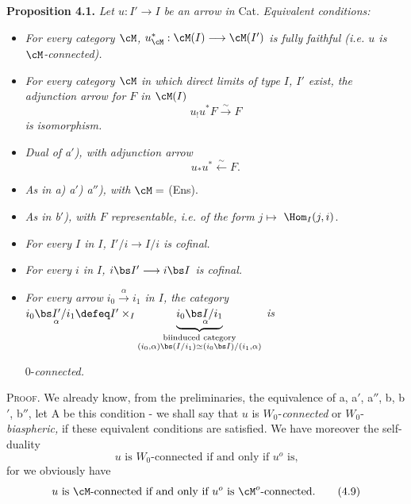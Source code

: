 \noindent\textbf{Proposition 4.1.} \textit{Let $u : I' \longrightarrow I$ be an arrow in} Cat. \textit{Equivalent conditions:}
\begin{itemize}[label={}]
\item[\textit{a)}] \textit{For every category $\cM$, $u^*_{\cM} : \cM(I) \longrightarrow \cM(I')$ is fully faithful (i.e. $u$ is $\cM$-connected).}
\item[\textit{a$'$)}] \textit{For every category $\cM$ in which direct limits of type $I$, $I'$ exist, the adjunction arrow for $F$ in $\cM(I)$} %
\[
u_!u^*F \xrightarrow{\sim} F
\]
\textit{is} \textit{isomorphism.}
\item[\textit{a$''$)}] \textit{Dual of a$'$), with} \textit{adjunction arrow}
\[
u_*u^* \xleftarrow{\sim} F. %
\]
\item[\textit{b) b$'$) b$''$)}] \textit{As in a) a$'$) a$''$), with $\cM =$} (Ens).
\item[\textit{c)}] \textit{As in b$'$), with $F$ representable, i.e. of the form $j \longmapsto$} $\Hom_I(j, i)$.
\item[\textit{d)}] \textit{For every $I$ in $I$, $I'/i \longrightarrow I/i$ is cofinal.} %
\item[\textit{d$'$)}] \textit{For every $i$ in $I$, $i\bs I' \longrightarrow i\bs I$ is cofinal.}
\item[\textit{d$''$)}] \textit{For every arrow $i_0 \xrightarrow{\alpha} i_1$ in $I$, the category} $i_0\bs \underset{\alpha}{I'}/i_1 \defeq I' \times_I \underbrace{i_0\bs \underset{\alpha}{I}/i_1}_{\substack{\text{biinduced category}\\ (i_0, \alpha)\bs(I/i_1) \simeq (i_0\bs I)/(i_1, \alpha)}}$ \qquad \textit{is}

0-\textit{connected.}
\end{itemize}

\textsc{Proof.} We already know, from the preliminaries, the equivalence of a, a$'$, a$''$, b, b$'$, b$''$, let A be this condition - we shall say that $u$ is $W_0$-\textit{connected} or $W_0$-\textit{biaspheric,} if these equivalent conditions are satisfied. We have moreover the self-duality
\[
\text{$u$ is $W_0$-connected if and only if $u^o$ is,}
\tag*{(4.8)} %
\]
for we obviously have
\[
\text{$u$ is $\cM$-connected if and only if $u^o$ is $\cM^o$-connected.}
\tag*{(4.9)}
\]